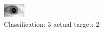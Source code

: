 \begin{figure}[h!]
\begin{center}
\includegraphics[width=0.60\columnwidth]{figures/ID1764_class_3_target_2.png}
\end{center}
\caption{ Classification: 3 actual target: 2}
\label{fig:ID1764_class_3_target_2}
\end{figure}
